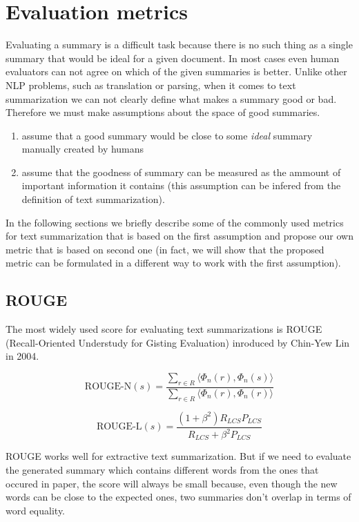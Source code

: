 \documentclass[sigplan]{acmart}
\begin{document}
\section{Evaluation metrics}
\label{sec:evaluation}

Evaluating a summary is a difficult task because there is no such thing as a single summary that would be ideal for a given document. In most cases even human evaluators can not agree on which of the given summaries is better\cite{das-7}. Unlike other NLP problems, such as translation or parsing, when it comes to text summarization we can not clearly define what makes a summary good or bad. Therefore we must make assumptions about the space of good summaries. 

\begin{enumerate}
\item assume that a good summary would be close to some \textit{ideal} summary manually created by humans
\item assume that the goodness of summary can be measured as the ammount of important information it contains (this assumption can be infered from the definition of text summarization).
\end{enumerate}

In the following sections we briefly describe some of the commonly used metrics for text summarization that is based on the first assumption and propose our own metric that is based on second one (in fact, we will show that the proposed metric can be formulated in a different way to work with the first assumption).

\subsection{ROUGE}
\label{sec:rouge}

The most widely used score for evaluating text summarizations is ROUGE (Recall-Oriented Understudy for Gisting Evaluation) inroduced by Chin-Yew Lin in 2004\cite{lin-4}.

\[ \text{ROUGE-N}(s) = \frac{\sum_{r \in R} \langle \Phi_n(r), \Phi_n(s) \rangle}{\sum_{r \in R} \langle \Phi_n(r), \Phi_n(r) \rangle} \]

\[ \text{ROUGE-L}(s) = \frac{(1 + \beta^2) R_{LCS} P_{LCS}}{R_{LCS} + \beta^2 P_{LCS}} \]

ROUGE works well for extractive text summarization. But if we need to evaluate the generated summary which contains different words from the ones that occured in paper, the score will always be small because, even though the new words can be close to the expected ones, two summaries don't overlap in terms of word equality.
\end{document}
